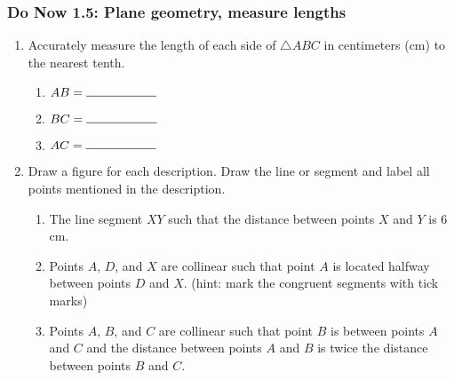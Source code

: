 \documentclass[12pt, oneside]{article}
\begin{document}
\newpage
\subsubsection*{Do Now 1.5: Plane geometry, measure lengths}
  \begin{enumerate}
    \item Accurately measure the length of each side of $\triangle ABC$ in centimeters (cm) to the nearest tenth.
      \bigskip
    \begin{enumerate}
      \item $AB=\rule{2cm}{0.15mm}$ \bigskip
      \item $BC=\rule{2cm}{0.15mm}$ \bigskip
      \item $AC=\rule{2cm}{0.15mm}$
    \end{enumerate}
    \begin{center}
    \end{center}

  \item Draw a figure for each description. Draw the line or segment and label all points mentioned in the description.
  \begin{enumerate}
    \item The line segment $XY$ such that the distance between points $X$ and $Y$ is 6 cm. \vspace{2cm}
    \item Points $A$, $D$, and $X$ are collinear such that point $A$ is located halfway between points $D$ and $X$. (hint: mark the congruent segments with tick marks) \vspace{2cm}
    \item Points $A$, $B$, and $C$ are collinear such that point $B$ is between points $A$ and $C$ and the distance between points $A$ and $B$ is twice the distance between points $B$ and $C$. \vspace{2cm}
  \end{enumerate}
  \end{enumerate}

\newpage
\end{document}
